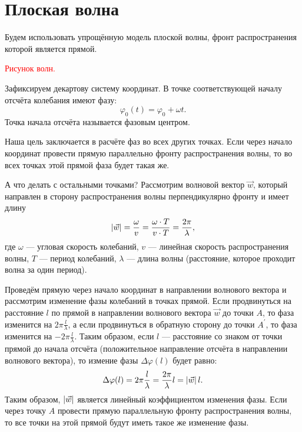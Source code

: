 \chapter{Плоская волна}

Будем использовать упрощённую модель плоской волны, фронт распространения которой является прямой.

\textcolor{red}{Рисунок волн.}

Зафиксируем декартову систему координат. В точке соответствующей началу отсчёта колебания имеют фазу:
\[
    \varphi_0(t) = \varphi_0 + \omega t.
\]
Точка начала отсчёта называется фазовым центром.

Наша цель заключается в расчёте фаз во всех других точках. Если через начало координат провести прямую параллельно фронту распространения волны, то во всех точках
этой прямой фаза будет такая же.

А что делать с остальными точками? Рассмотрим волновой вектор $\vec{w}$, который направлен в сторону распространения волны перпендикулярно фронту и имеет длину
\[
    \left | \vec{w} \right |
    = \frac{\omega}{v}
    = \frac{\omega \cdot T}{v \cdot T}
    = \frac{2 \pi}{\lambda} ,
\]
где $\omega$ --- угловая скорость колебаний, $v$ --- линейная скорость распространения волны, $T$ --- период колебаний, $\lambda$ --- длина волны (расстояние,
которое проходит волна за один период).

Проведём прямую через начало координат в направлении волнового вектора и рассмотрим изменение фазы колебаний в точках прямой. Если продвинуться на расстояние
$l$ по прямой в направлении волнового вектора $\vec{w}$ до точки $A$, то фаза изменится на $2 \pi \frac{l}{\lambda}$, а если продвинуться в обратную сторону
до точки $A^\prime$, то фаза изменится на $- 2 \pi \frac{l}{\lambda}$. Таким образом, если $l$ --- расстояние со знаком от точки прямой до начала отсчёта
(положительное направление отсчёта в направлении волнового вектора), то измение фазы $\Delta \varphi(l)$ будет равно:
\[
    \Delta \varphi(l)
    = 2 \pi \frac{l}{\lambda}
    = \frac{2 \pi} {\lambda} l
    = \left | \vec{w} \right | l .
\]
Таким образом, $\left | \vec{w} \right |$ является линейный коэффициентом изменения фазы. Если через точку $A$ провести прямую параллельную фронту распространения волны,
то все точки на этой прямой будут иметь такое же изменение фазы.

